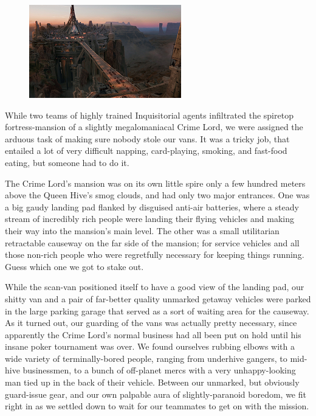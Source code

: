 \begin{figure}
	\begin{center}
		\includegraphics[width=\figwidth]{pics/18/48.png}
	\end{center}
\end{figure}
While two teams of highly trained Inquisitorial agents infiltrated the spiretop fortress-mansion of a slightly megalomaniacal Crime Lord, we were assigned the arduous task of making sure nobody stole our vans. 
It was a tricky job, that entailed a lot of very difficult napping, card-playing, smoking, and fast-food eating, but someone had to do it.

The Crime Lord's mansion was on its own little spire only a few hundred meters above the Queen Hive's smog clouds, and had only two major entrances. 
One was a big gaudy landing pad flanked by disguised anti-air batteries, where a steady stream of incredibly rich people were landing their flying vehicles and making their way into the mansion's main level. 
The other was a small utilitarian retractable causeway on the far side of the mansion; 
for service vehicles and all those non-rich people who were regretfully necessary for keeping things running. 
Guess which one we got to stake out.

While the scan-van positioned itself to have a good view of the landing pad, our shitty van and a pair of far-better quality unmarked getaway vehicles were parked in the large parking garage that served as a sort of waiting area for the causeway. 
As it turned out, our guarding of the vans was actually pretty necessary, since apparently the Crime Lord's normal business had all been put on hold until his insane poker tournament was over. 
We found ourselves rubbing elbows with a wide variety of terminally-bored people, ranging from underhive gangers, to mid-hive businessmen, to a bunch of off-planet mercs with a very unhappy-looking man tied up in the back of their vehicle. 
Between our unmarked, but obviously guard-issue gear, and our own palpable aura of slightly-paranoid boredom, we fit right in as we settled down to wait for our teammates to get on with the mission.

